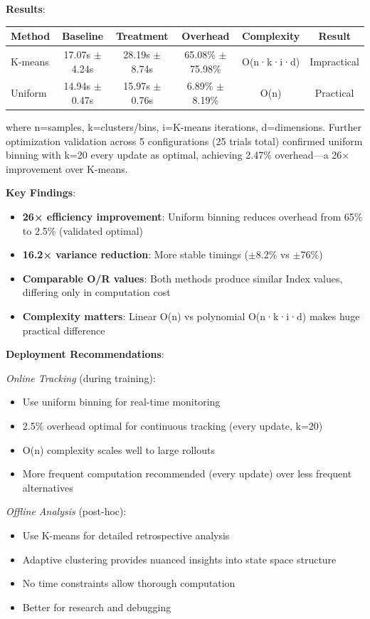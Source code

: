 \documentclass[twoside]{article}
\theoremstyle{remark}
\begin{document}
\textbf{Results}:

\begin{center}
\begin{tabular}{lccccc}
\toprule
\textbf{Method} & \textbf{Baseline} & \textbf{Treatment} & \textbf{Overhead} & \textbf{Complexity} & \textbf{Result} \\
\midrule
K-means & 17.07s $\pm$ 4.24s & 28.19s $\pm$ 8.74s & 65.08\% $\pm$ 75.98\% & O(n·k·i·d) & Impractical \\
Uniform & 14.94s $\pm$ 0.47s & 15.97s $\pm$ 0.76s & 6.89\% $\pm$ 8.19\% & O(n) & Practical \\
\bottomrule
\end{tabular}
\end{center}

where n=samples, k=clusters/bins, i=K-means iterations, d=dimensions. Further optimization validation across 5 configurations (25 trials total) confirmed uniform binning with k=20 every update as optimal, achieving 2.47\% overhead—a 26× improvement over K-means.

\textbf{Key Findings}:
\begin{itemize}
    \item \textbf{26× efficiency improvement}: Uniform binning reduces overhead from 65\% to 2.5\% (validated optimal)
    \item \textbf{16.2× variance reduction}: More stable timings ($\pm$8.2\% vs $\pm$76\%)
    \item \textbf{Comparable O/R values}: Both methods produce similar Index values, differing only in computation cost
    \item \textbf{Complexity matters}: Linear O(n) vs polynomial O(n·k·i·d) makes huge practical difference
\end{itemize}

\textbf{Deployment Recommendations}:

\textit{Online Tracking} (during training):
\begin{itemize}
    \item Use uniform binning for real-time monitoring
    \item 2.5\% overhead optimal for continuous tracking (every update, k=20)
    \item O(n) complexity scales well to large rollouts
    \item More frequent computation recommended (every update) over less frequent alternatives
\end{itemize}

\textit{Offline Analysis} (post-hoc):
\begin{itemize}
    \item Use K-means for detailed retrospective analysis
    \item Adaptive clustering provides nuanced insights into state space structure
    \item No time constraints allow thorough computation
    \item Better for research and debugging
\end{itemize}
\end{document}
